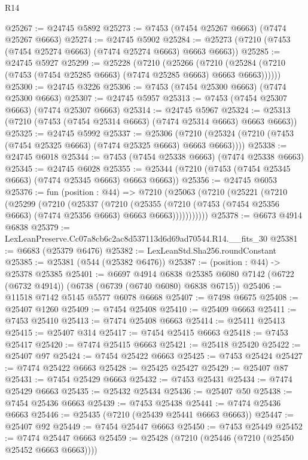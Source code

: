 \begin{lexlean}{R14}
\begin{coremodule}
@25267 := @24745 @5892
@25273 := @7453 (@7454 @25267 @6663) (@7474 @25267 @6663)
@25274 := @24745 @5902
@25284 := @25273 (@7210 (@7453 (@7454 @25274 @6663) (@7474 @25274 @6663) @6663 @6663))
@25285 := @24745 @5927
@25299 := @25228
    (@7210
      (@25266
        (@7210 (@25284 (@7210 (@7453 (@7454 @25285 @6663) (@7474 @25285 @6663) @6663 @6663))))))
@25300 := @24745 @3226
@25306 := @7453 (@7454 @25300 @6663) (@7474 @25300 @6663)
@25307 := @24745 @5957
@25313 := @7453 (@7454 @25307 @6663) (@7474 @25307 @6663)
@25314 := @24745 @5967
@25324 := @25313 (@7210 (@7453 (@7454 @25314 @6663) (@7474 @25314 @6663) @6663 @6663))
@25325 := @24745 @5992
@25337 := @25306
    (@7210 (@25324 (@7210 (@7453 (@7454 @25325 @6663) (@7474 @25325 @6663) @6663 @6663))))
@25338 := @24745 @6018
@25344 := @7453 (@7454 @25338 @6663) (@7474 @25338 @6663)
@25345 := @24745 @6028
@25355 := @25344 (@7210 (@7453 (@7454 @25345 @6663) (@7474 @25345 @6663) @6663 @6663))
@25356 := @24745 @6053
@25376 := fun (position : @44) =>
  @7210
    (@25063
      (@7210
        (@25221
          (@7210
            (@25299
              (@7210
                (@25337
                  (@7210
                    (@25355
                      (@7210 (@7453 (@7454 @25356 @6663) (@7474 @25356 @6663) @6663 @6663)))))))))))
@25378 := @6673 @4914 @6838
@25379 := LexLeanPreserve.Cc07a8cb6c2ac8d537113d6d69ad70544.R14.__fits_30
@25381 := @6683 (@25379 @6476)
@25382 := LexLeanStd.Sha256.roundConstant
@25385 := @25381 (@544 (@25382 @6476))
@25387 := (position : @44) -> @25378 @25385
@25401 := @6697
    @4914
    @6838
    @25385
    @6080
    @7142
    (@6722 (@6732 @4914))
    (@6738 (@6739 (@6740 @6080) @6838 @6715))
@25406 := @11518 @7142 @5145 @5577 @6078 @6668
@25407 := @7498 @6675
@25408 := @25407 @1260
@25409 := @7454 @25408
@25410 := @25409 @6663
@25411 := @7453 @25410
@25413 := @7474 @25408 @6663
@25414 := @25411 @25413
@25415 := @25407 @314
@25417 := @7454 @25415 @6663
@25418 := @7453 @25417
@25420 := @7474 @25415 @6663
@25421 := @25418 @25420
@25422 := @25407 @97
@25424 := @7454 @25422 @6663
@25425 := @7453 @25424
@25427 := @7474 @25422 @6663
@25428 := @25425 @25427
@25429 := @25407 @87
@25431 := @7454 @25429 @6663
@25432 := @7453 @25431
@25434 := @7474 @25429 @6663
@25435 := @25432 @25434
@25436 := @25407 @50
@25438 := @7454 @25436 @6663
@25439 := @7453 @25438
@25441 := @7474 @25436 @6663
@25446 := @25435 (@7210 (@25439 @25441 @6663 @6663))
@25447 := @25407 @92
@25449 := @7454 @25447 @6663
@25450 := @7453 @25449
@25452 := @7474 @25447 @6663
@25459 := @25428 (@7210 (@25446 (@7210 (@25450 @25452 @6663 @6663))))

\end{coremodule}
\end{lexlean}
